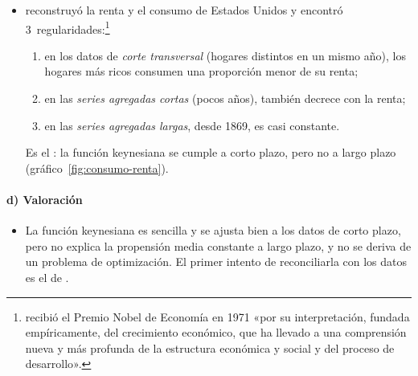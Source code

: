 \documentclass[11pt]{article}
\begin{document}
\begin{itemize}
{Las necesidades de la economía de guerra resolvieron el problema del empleo, y las décadas de posguerra trajeron la demanda acumulada de los consumidores, un resurgir de la innovación, la apertura comercial y un fuerte aumento de la población: crecimiento rápido y rentas crecientes. El debate ha vuelto tras la Gran Recesión ; lo repasa una \href{https://blogs.elconfidencial.com/espana/tribuna/2019-12-07/crisis-estancamiento-secular_2366680/}{tribuna de \emph{El Confidencial} del 7~de diciembre de 2019}.} Tras la Segunda Guerra Mundial, sin embargo, la renta creció, el gasto público bajó y el consumo creció con la renta: la propensión media no caía. En parte, porque los hogares, racionados durante la guerra, habían acumulado bonos públicos y los gastaron después (un \emph{efecto riqueza}).
\item \textcite{Kuznets1942Uses,Kuznets1946National} reconstruyó la renta y el consumo de Estados Unidos y encontró 3~regularidades:\footnote{ recibió el Premio Nobel de Economía en 1971 «por su interpretación, fundada empíricamente, del crecimiento económico, que ha llevado a una comprensión nueva y más profunda de la estructura económica y social y del proceso de desarrollo»\nocite{Nobel1971Kuznets}.}
  \begin{enumerate}
  \item en los datos de \emph{corte transversal} (hogares distintos en un mismo año), los hogares más ricos consumen una proporción menor de su renta;
  \item en las \emph{series agregadas cortas} (pocos años), también decrece con la renta;
  \item en las \emph{series agregadas largas}, desde 1869, es casi constante.
  \end{enumerate}
  Es el : la función keynesiana se cumple a corto plazo, pero no a largo plazo (gráfico~\ref{fig:consumo-renta}).
\end{itemize}

\paragraph{d) Valoración}

\begin{itemize}
\item La función keynesiana es sencilla y se ajusta bien a los datos de corto plazo, pero no explica la propensión media constante a largo plazo, y no se deriva de un problema de optimización. El primer intento de reconciliarla con los datos es el de .
\end{itemize}
\end{document}
